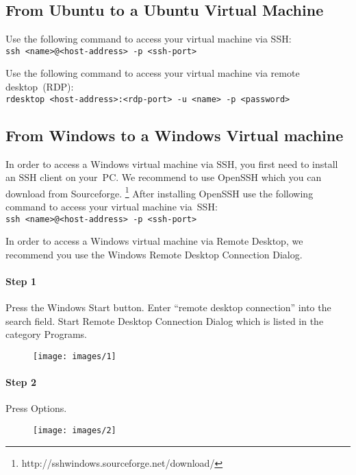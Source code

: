 \subsection*{From Ubuntu to a Ubuntu Virtual Machine}

\enlargethispage{\baselineskip}
\medskip\noindent
Use the following command to access your virtual machine via SSH:\\
\texttt{ssh <name>@<host-address> -p <ssh-port>}

\medskip\noindent
Use the following command to access your virtual machine via remote desktop~(RDP):\\
\texttt{rdesktop <host-address>:<rdp-port> -u <name> -p <password>}

\subsection*{From Windows to a Windows Virtual machine}

In order to access a Windows virtual machine via SSH, you first need to install an SSH client on your~PC. We recommend to use OpenSSH which you can download from Sourceforge.%
\footnote{http://sshwindows.sourceforge.net/download/}
After installing OpenSSH use the following command to access your virtual machine via~SSH:\\
\texttt{ssh <name>@<host-address> -p <ssh-port>}

\medskip\noindent
In order to access a Windows virtual machine via Remote Desktop, we recommend you use the Windows Remote Desktop Connection Dialog.

\paragraph{Step 1}

Press the Windows Start button. Enter ``remote desktop connection'' into the search field. Start Remote Desktop Connection Dialog which is listed in the category Programs.

\begin{figure}[H]
\centering
\texttt{[image: images/1]}
\label{fig1}
\end{figure}

\paragraph{Step 2}

Press Options.
\begin{figure}[H]
\centering
\texttt{[image: images/2]}
\label{fig2}
\end{figure}

